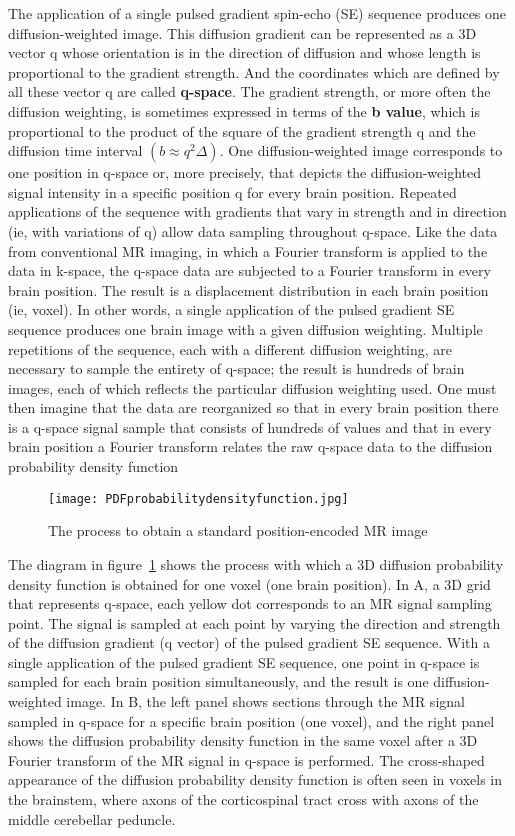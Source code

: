 The application of a single pulsed gradient spin-echo (SE) sequence produces one diffusion-weighted image. This diffusion gradient can be represented as a 3D vector q whose orientation is in the direction of diffusion and whose length is proportional to the gradient strength. And the coordinates which are defined by all these vector q are called \textbf{q-space}. The gradient strength, or more often the diffusion weighting, is sometimes expressed in terms of the \textbf{b value}, which is proportional to the product of the square of the gradient strength q and the diffusion time interval $(b\approx q^{2}\Delta)$. One diffusion-weighted image corresponds to one position in q-space or, more precisely, that depicts the diffusion-weighted signal intensity in a specific position q for every brain position. Repeated applications of the sequence with gradients that vary in strength and in direction (ie, with variations of q) allow data sampling throughout q-space. Like the data from conventional MR imaging, in which a Fourier transform is applied to the data in k-space, the q-space data are subjected to a Fourier transform in every brain position. The result is a displacement distribution in each brain position (ie, voxel). In other words, a single application of the pulsed gradient SE sequence produces one brain image with a given diffusion weighting. Multiple repetitions of the sequence, each with a different diffusion weighting, are necessary to sample the entirety of q-space; the result is hundreds of brain images, each of which reflects the particular diffusion weighting used. One must then imagine that the data are reorganized so that in every brain position there is a q-space signal sample that consists of hundreds of values and that in every brain position a Fourier transform relates the raw q-space data to the diffusion probability density function 

\begin{figure} 
  \centering 
  \texttt{[image: PDFprobabilitydensityfunction.jpg]}
  \caption{The process to obtain a standard position-encoded MR image}
  \label{Fig:pdf}
\end{figure}

The diagram in figure~\ref{Fig:pdf} shows the process with which a 3D diffusion probability density function is obtained for one voxel (one brain position). In A, a 3D grid that represents q-space, each yellow dot corresponds to an MR signal sampling point. The signal is sampled at each point by varying the direction and strength of the diffusion gradient (q vector) of the pulsed gradient SE sequence. With a single application of the pulsed gradient SE sequence, one point in q-space is sampled for each brain position simultaneously, and the result is one diffusion-weighted image. In B, the left panel shows sections through the MR signal sampled in q-space for a specific brain position (one voxel), and the right panel shows the diffusion probability density function in the same voxel after a 3D Fourier transform of the MR signal in q-space is performed. The cross-shaped appearance of the diffusion probability density function is often seen in voxels in the brainstem, where axons of the corticospinal tract cross with axons of the middle cerebellar peduncle.

